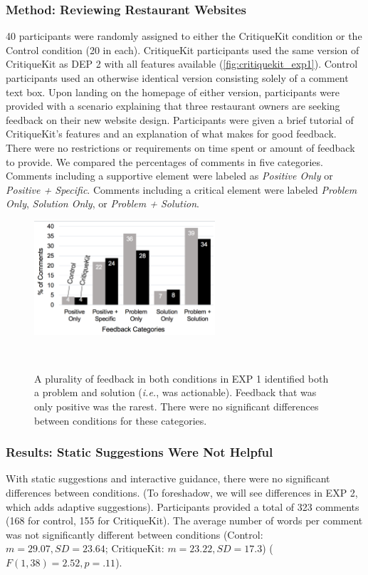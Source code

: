 \subsubsection{Method: Reviewing Restaurant Websites}
40 participants were randomly assigned to either the CritiqueKit condition or the Control condition (20 in each). CritiqueKit participants used the same version of CritiqueKit as DEP 2 with all features available (\autoref{fig:critiquekit_exp1}). Control participants used an otherwise identical version consisting solely of a comment text box. Upon landing on the homepage of either version, participants were provided with a scenario explaining that three restaurant owners are seeking feedback on their new website design. Participants were given a brief tutorial of CritiqueKit's features and an explanation of what makes for good feedback. There were no restrictions or requirements on time spent or amount of feedback to provide. We compared the percentages of comments in five categories. Comments including a supportive element were labeled as \textit{Positive Only} or \textit{Positive + Specific}. Comments including a critical element were labeled \textit{Problem Only}, \textit{Solution Only}, or \textit{Problem + Solution}.

\begin{figure}
\centering
  \includegraphics[width=0.6\textwidth]{critiquekit/figures/exp1_feedbacktypes.png}
  \caption{A plurality of feedback in both conditions in EXP 1 identified both a problem and solution (\textit{i.e.}, was actionable). Feedback that was only positive was the rarest. There were no significant differences between conditions for these categories.}~\label{fig:critiquekit_exp1_results}
\end{figure}

\subsubsection{Results: Static Suggestions Were Not Helpful}
With static suggestions and interactive guidance, there were no significant differences between conditions. (To foreshadow, we will see differences in EXP 2, which adds adaptive suggestions). Participants provided a total of 323 comments (168 for control, 155 for CritiqueKit). The average number of words per comment was not significantly different between conditions (Control: $m = 29.07, SD = 23.64$; CritiqueKit: $m = 23.22, SD = 17.3$) ($F(1,38) = 2.52, p = .11$).

